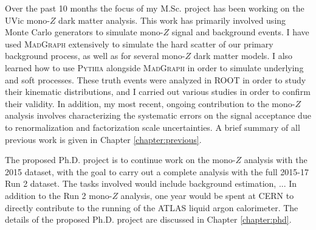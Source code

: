 \label{chapter:introduction}

Over the past 10 months the focus of my M.Sc. project has been working on the UVic mono-$Z$ dark matter analysis. This work has primarily involved using Monte Carlo generators to simulate mono-$Z$ signal and background events. I have used \textsc{MadGraph} extensively to simulate the hard scatter of our primary background process, as well as for several mono-$Z$ dark matter models. I also learned how to use \textsc{Pythia} alongside \textsc{MadGraph} in order to simulate underlying and soft processes. These truth events were analyzed in ROOT in order to study their kinematic distributions, and I carried out various studies in order to confirm their validity. In addition, my most recent, ongoing contribution to the mono-$Z$ analysis involves characterizing the systematic errors on the signal acceptance due to renormalization and factorization scale uncertainties. A brief summary of all previous work is given in Chapter \ref{chapter:previous}. 

The proposed Ph.D. project is to continue work on the mono-$Z$ analysis with the 2015 dataset, with the goal to carry out a complete analysis with the full 2015-17 Run 2 dataset. The tasks involved would include background estimation, ... In addition to the Run 2 mono-$Z$ analysis, one year would be spent at CERN to directly contribute to the running of the ATLAS liquid argon calorimeter. The details of the proposed Ph.D. project are discussed in Chapter \ref{chapter:phd}.